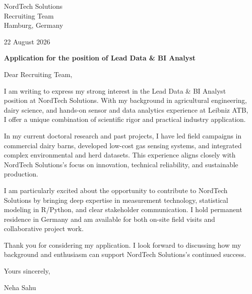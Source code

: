 \documentclass[10pt,a4paper]{article}
\begin{document}

NordTech Solutions\\

Recruiting Team\\

Hamburg, Germany

\vspace{10pt}
22 August 2026

\vspace{10pt}
\textbf{Application for the position of Lead Data \& BI Analyst}


\vspace{8pt}
Dear Recruiting Team,


I am writing to express my strong interest in the Lead Data \& BI Analyst position at NordTech Solutions. With my background in agricultural engineering, dairy science, and hands-on sensor and data analytics experience at Leibniz ATB, I offer a unique combination of scientific rigor and practical industry application.

\vspace{4pt}

In my current doctoral research and past projects, I have led field campaigns in commercial dairy barns, developed low-cost gas sensing systems, and integrated complex environmental and herd datasets. This experience aligns closely with NordTech Solutions's focus on innovation, technical reliability, and sustainable production.

\vspace{4pt}

I am particularly excited about the opportunity to contribute to NordTech Solutions by bringing deep expertise in measurement technology, statistical modeling in R/Python, and clear stakeholder communication. I hold permanent residence in Germany and am available for both on-site field visits and collaborative project work.

\vspace{4pt}

Thank you for considering my application. I look forward to discussing how my background and enthusiasm can support NordTech Solutions's continued success.

\vspace{4pt}


Yours sincerely,

\vspace{14pt}
Neha Sahu
\end{document}
